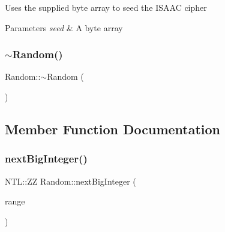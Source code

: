 Uses the supplied byte array to seed the I\+S\+A\+AC cipher 
\begin{DoxyParams}{Parameters}
{\em seed} & A byte array \\
\hline
\end{DoxyParams}
\mbox{\label{classRandom_ac0d4eaf1f32df4600eb321cb8dbc0c55}} 
\subsubsection{\texorpdfstring{$\sim$\+Random()}{~Random()}}
{\footnotesize\ttfamily Random\+::$\sim$\+Random (\begin{DoxyParamCaption}{ }\end{DoxyParamCaption})\hspace{0.3cm}{\ttfamily [virtual]}}



\subsection{Member Function Documentation}
\mbox{\label{classRandom_a5347f94bb53028350ad9f46c375aae45}} 
\subsubsection{\texorpdfstring{next\+Big\+Integer()}{nextBigInteger()}\hspace{0.1cm}{\footnotesize\ttfamily [1/2]}}
{\footnotesize\ttfamily N\+T\+L\+::\+ZZ Random\+::next\+Big\+Integer (\begin{DoxyParamCaption}\item[{N\+T\+L\+::\+ZZ \&}]{range }\end{DoxyParamCaption})}

